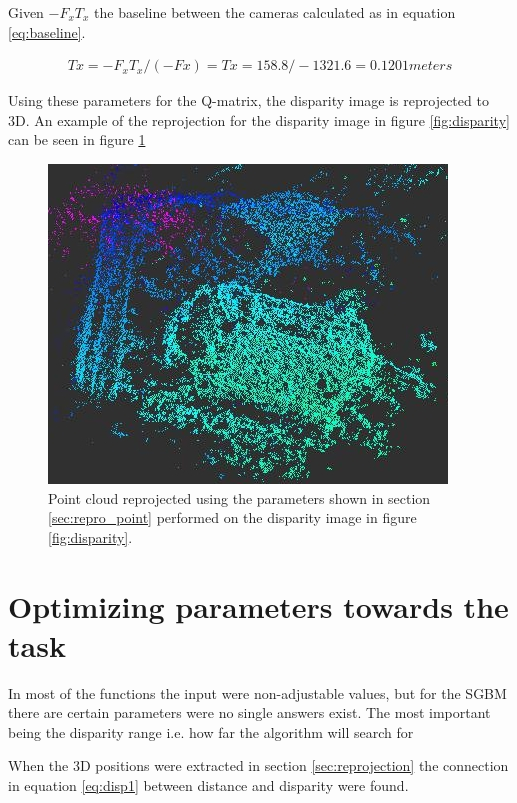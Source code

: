 Given $ -F_{x}T_{x} $ the baseline between the cameras calculated as in equation \ref{eq:baseline}.

\begin{equation}\label{eq:baseline}
\begin{split}
Tx = -F_{x}T_{x}/(-Fx) = Tx = 158.8/-1321.6 = 0.1201 meters
\end{split}
\end{equation} 

Using these parameters for the Q-matrix, the disparity image is reprojected to 3D. An example of the reprojection for the disparity image in figure \ref{fig:disparity} can be seen in figure \ref{fig:point_repro}


\begin{figure}[h!]
  \centering
    \includegraphics[scale=0.7]{graphics/06_vision/point_cloud_example2.jpg} %
  \caption{Point cloud reprojected using the parameters shown in section \ref{sec:repro_point} performed on the disparity image in figure \ref{fig:disparity}. }
    \label{fig:point_repro}
\end{figure}


\section{ Optimizing parameters towards the task } \label{sec:optimizing_parameters}

In most of the functions the input were non-adjustable values, but for the SGBM there are certain parameters were no single answers exist. The most important being the disparity range i.e. how far the algorithm will search for 


When the 3D positions were extracted in section \ref{sec:reprojection} the connection in equation \ref{eq:disp1} between distance and disparity were found.


